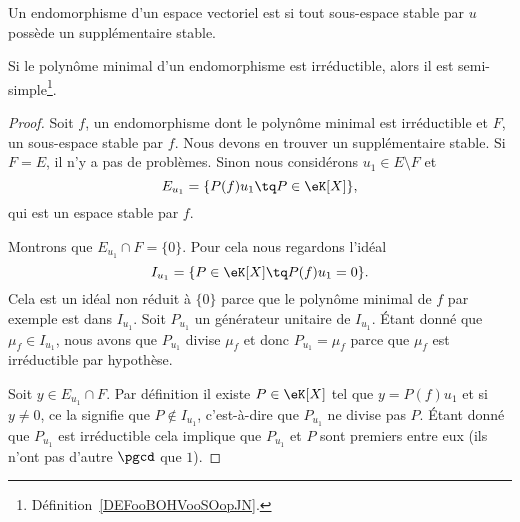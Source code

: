 \begin{definition}  \label{DEFooBOHVooSOopJN}
    Un endomorphisme d'un espace vectoriel est  si tout sous-espace stable par \( u\) possède un supplémentaire stable.
\end{definition}

\begin{lemma}   \label{LemrFINYT}
    Si le polynôme minimal d'un endomorphisme est irréductible, alors il est semi-simple\footnote{Définition~\ref{DEFooBOHVooSOopJN}.}.
\end{lemma}

\begin{proof}
    Soit \( f\), un endomorphisme dont le polynôme minimal est irréductible et \( F\), un sous-espace stable par \( f\). Nous devons en trouver un supplémentaire stable. Si \( F=E\), il n'y a pas de problèmes. Sinon nous considérons \( u_1\in E\setminus F\) et
    \begin{equation}
        E_{u_1}=\{ P(f)u_1\tq P\in \eK[X] \},
    \end{equation}
    qui est un espace stable par \( f\).

    Montrons que \( E_{u_1}\cap F=\{ 0 \}\). Pour cela nous regardons l'idéal
    \begin{equation}
        I_{u_1}=\{ P\in \eK[X]\tq P(f)u_1=0 \}.
    \end{equation}
    Cela est un idéal non réduit à \( \{ 0 \}\) parce que le polynôme minimal de \( f\) par exemple est dans \( I_{u_1}\). Soit \( P_{u_1}\) un générateur unitaire de \( I_{u_1}\). Étant donné que \( \mu_f\in I_{u_1}\), nous avons que \( P_{u_1}\) divise \( \mu_f\) et donc \( P_{u_1}=\mu_f\) parce que \( \mu_f\) est irréductible par hypothèse.

    Soit \( y\in E_{u_1}\cap F\). Par définition il existe \( P\in\eK[X]\) tel que \( y=P(f)u_1\) et si \( y\neq 0\), ce la signifie que \( P\notin I_{u_1}\), c'est-à-dire que \( P_{u_1} \) ne divise pas \( P\). Étant donné que \( P_{u_1}\) est irréductible cela implique que \( P_{u_1}\) et \( P\) sont premiers entre eux (ils n'ont pas d'autre \( \pgcd\) que \( 1\)).


\end{proof}
